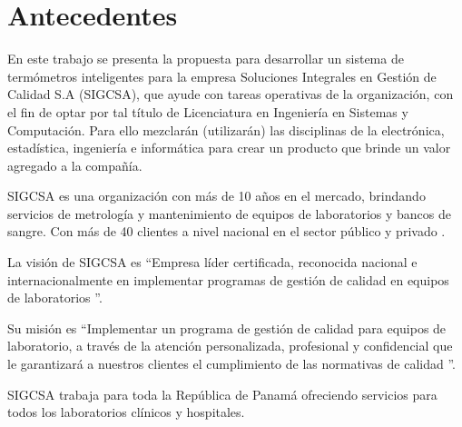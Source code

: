 \section{Antecedentes}

\par 
En este trabajo se presenta la propuesta para desarrollar un sistema de termómetros inteligentes para la empresa 			Soluciones Integrales en Gestión de Calidad S.A (SIGCSA), que 	ayude con tareas operativas de la organización, con el fin de 	optar por tal título de Licenciatura en Ingeniería en Sistemas y Computación. Para ello mezclarán (utilizarán) las disciplinas de la electrónica, estadística, ingeniería e informática para crear un producto que brinde un valor agregado a la compañía.

\par \noindent
SIGCSA es una organización con más de 10 años en el mercado, brindando servicios de metrología y mantenimiento de equipos de laboratorios y bancos de sangre. Con más de 40 clientes a nivel nacional en el sector público y privado \cite{sigcsa-nosotros}.

\par  \noindent 
La visión de SIGCSA es \textquotedblleft Empresa líder certificada, reconocida nacional e internacionalmente en implementar programas de gestión de calidad en equipos de laboratorios \textquotedblright \cite{sigcsa-nosotros}.

\par \noindent
Su misión es \textquotedblleft Implementar un programa de gestión de calidad para equipos de laboratorio, a través de la atención personalizada, profesional y confidencial que le garantizará a nuestros clientes el cumplimiento de las normativas de calidad \textquotedblright \cite{sigcsa-nosotros}.

\par \noindent
SIGCSA trabaja para toda la República de Panamá ofreciendo servicios para todos los laboratorios clínicos y hospitales.

